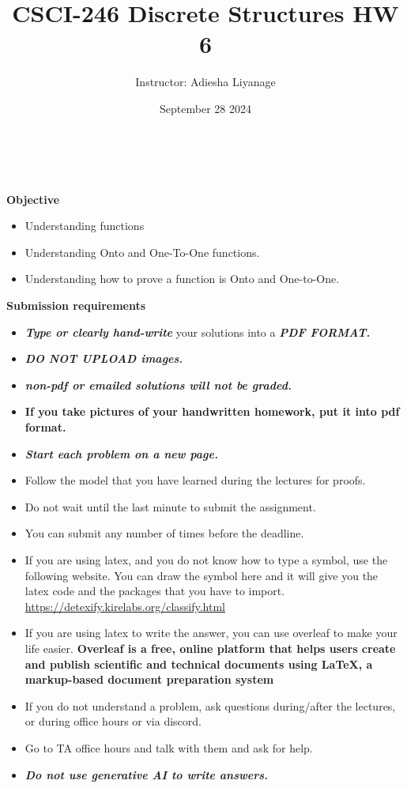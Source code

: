 \documentclass[12pt]{exam}
\title{CSCI-246 Discrete Structures HW 6}
\author{Instructor: Adiesha Liyanage}
\date{September 28 2024}
\begin{document}
\maketitle

\hrulefill
\\
\\
\textbf{Objective}
\begin{itemize}
    \item Understanding functions
    \item Understanding Onto and One-To-One functions.
    \item Understanding how to prove a function is Onto and One-to-One.
\end{itemize}

\textbf{Submission requirements}
\begin{itemize}
    \item \textbf{\textit{Type or clearly hand-write}} your solutions into a \textbf{\textit{PDF FORMAT.}} 
    \item \textbf{\textit{DO NOT UPLOAD images.}}
    \item \textbf{\textit{non-pdf or emailed solutions will not be graded.}}
    \item \textbf{If you take pictures of your handwritten homework, put it into pdf format.}
    \item \textbf{\textit{Start each problem on a new page.}}
    \item Follow the model that you have learned during the lectures for proofs.
    \item Do not wait until the last minute to submit the assignment.
    \item You can submit any number of times before the deadline. 
    \item If you are using latex, and you do not know how to type a symbol, use the following website. You can draw the symbol here and it will give you the latex code and the packages that you have to import. \url{https://detexify.kirelabs.org/classify.html}
    \item If you are using latex to write the answer, you can use overleaf to make your life easier. \textbf{Overleaf is a free, online platform that helps users create and publish scientific and technical documents using LaTeX, a markup-based document preparation system}
    \item If you do not understand a problem, ask questions during/after the lectures, or during office hours or via discord.
    \item Go to TA office hours and talk with them and ask for help.
    \item \textbf{\textit{Do not use generative AI to write answers.}} 
\end{itemize}
\end{document}
